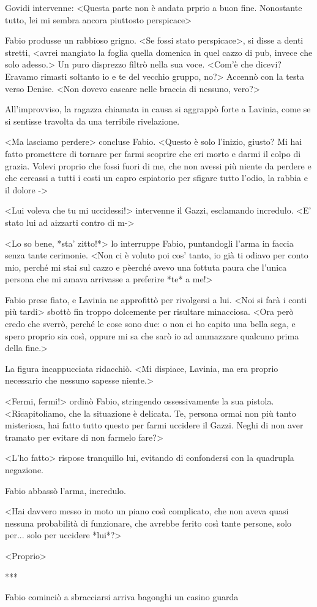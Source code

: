 Govidi intervenne: <Questa parte non è andata prprio a buon fine. Nonostante tutto, lei mi sembra ancora piuttosto perspicace>

Fabio produsse un rabbioso grigno. <Se fossi stato perspicace>, si disse a denti stretti, <avrei mangiato la foglia quella domenica in quel cazzo di pub, invece che solo adesso.> Un puro disprezzo filtrò nella sua voce. <Com'è che dicevi? Eravamo rimasti soltanto io e te del vecchio gruppo, no?> Accennò con la testa verso Denise. <Non dovevo cascare nelle braccia di nessuno, vero?>

All'improvviso, la ragazza chiamata in causa si aggrappò forte a Lavinia, come se si sentisse travolta da una terribile rivelazione.

<Ma lasciamo perdere> concluse Fabio. <Questo è solo l'inizio, giusto? Mi hai fatto promettere di tornare per farmi scoprire che eri morto e darmi il colpo di grazia. Volevi proprio che fossi fuori di me, che non avessi più niente da perdere e che cercassi a tutti i costi un capro espiatorio per sfigare tutto l'odio, la rabbia e il dolore ->

<Lui voleva che tu mi uccidessi!> intervenne il Gazzi, esclamando incredulo. <E' stato lui ad aizzarti contro di m->

<Lo so bene, *sta' zitto!*> lo interruppe Fabio, puntandogli l'arma in faccia senza tante cerimonie. <Non ci è voluto poi cos' tanto, io già ti odiavo per conto mio, perché mi stai sul cazzo e pèerché avevo una fottuta paura che l'unica persona che mi amava arrivasse a preferire *te* a me!>

Fabio prese fiato, e Lavinia ne approfittò per rivolgersi a lui. <Noi si farà i conti più tardi> sbottò fin troppo dolcemente per risultare minacciosa. <Ora però credo che sverrò, perché le cose sono due: o non ci ho capito una bella sega, e spero proprio sia così, oppure mi sa che sarò io ad ammazzare qualcuno prima della fine.>

La figura incappucciata ridacchiò. <Mi dispiace, Lavinia, ma era proprio necessario che nessuno sapesse niente.>

<Fermi, fermi!> ordinò Fabio, stringendo ossessivamente la sua pistola. <Ricapitoliamo, che la situazione è delicata. Te, persona ormai non più tanto misteriosa, hai fatto tutto questo per farmi uccidere il Gazzi. Neghi di non aver tramato per evitare di non farmelo fare?>

<L'ho fatto> rispose tranquillo lui, evitando di confondersi con la quadrupla negazione.

Fabio abbassò l'arma, incredulo.

<Hai davvero messo in moto un piano così complicato, che non aveva quasi nessuna probabilità di funzionare, che avrebbe ferito così tante persone, solo per... solo per uccidere *lui*?>

<Proprio>



***

Fabio cominciò a sbracciarsi
arriva bagonghi un casino guarda
